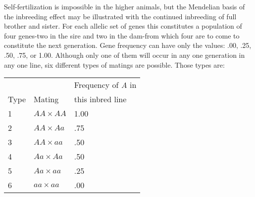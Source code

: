 Self-fertilization is impossible in the higher animals, but the Mendelian
basis of the inbreeding effect may be illustrated with the continued
inbreeding of full brother and sister. For each allelic set of genes
this constitutes a population of four genes-two in the sire and two in
the dam-from which four are to come to constitute the next generation.
Gene frequency can have only the values: .00, .25, .50, .75, or 1.00.
Although only one of them will occur in any one generation in any one
line, six different types of matings are possible. Those types are:

\begin{table}[h]
	\centering
	\begin{tabular}{C{3cm}C{3cm}C{3cm}}
						&						& Frequency of \textit{A} in \\
		Type 			& Mating				& this inbred line \\
		1				& \(AA \times AA\)		& 1.00 \\
		2				& \(AA \times Aa\)		& .75 \\
		3				& \(AA \times aa\)		& .50 \\
		4				& \(Aa \times Aa\)		& .50 \\
		5				& \(Aa \times aa\)		& .25 \\
		6				& \(aa \times aa\)		& .00 \\
	\end{tabular}
\end{table}

